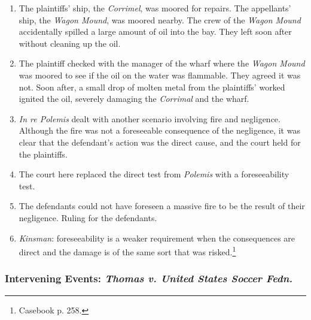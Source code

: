 \begin{enumerate}
    \item The plaintiffs' ship, the \emph{Corrimel}, was moored for repairs. 
    The appellants' ship, the \emph{Wagon Mound}, was moored nearby. The crew 
    of the \emph{Wagon Mound} accidentally spilled a large amount of oil into 
    the bay. They left soon after without cleaning up the oil.
    \item The plaintiff checked with the manager of the wharf where the 
    \emph{Wagon Mound} was moored to see if the oil on the water was 
    flammable. They agreed it was not. Soon after, a small drop of molten 
    metal from the plaintiffs' worked ignited the oil, severely damaging the 
    \emph{Corrimal} and the wharf.
    \item \emph{In re Polemis} dealt with another scenario involving fire and 
    negligence. Although the fire was not a foreseeable consequence of the 
    negligence, it was clear that the defendant's action was the direct cause, 
    and the court held for the plaintiffs.
    \item The court here replaced the direct test from \emph{Polemis} with a 
    foreseeability test.
    \item The defendants could not have foreseen a massive fire to be the 
    result of their negligence. Ruling for the defendants.
    \item \emph{Kinsman}: foreseeability is a weaker requirement when the 
    consequences are direct and the damage is of the same sort that was 
    risked.\footnote{Casebook p. 258.}
\end{enumerate}

\subsubsection{Intervening Events: \emph{Thomas v. United States Soccer 
Fedn.}}

